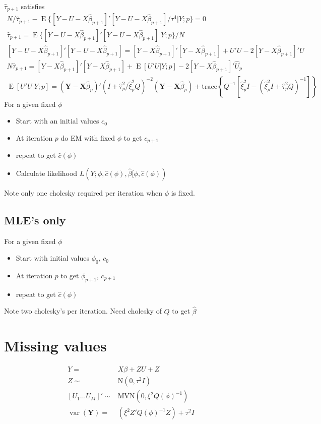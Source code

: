 \documentclass[12pt]{article}
\DeclareMathOperator{\E}{E}
\DeclareMathOperator{\var}{var}
\begin{document}
$\hat\tau_{p+1}$ satisfies
\begin{gather*}
N /\hat\tau_{p+1} -
\E\{[Y-U-X\hat\beta_{p+1}]'[Y-U-X\hat\beta_{p+1}]/\tau^4|Y;p\}=0\\
\hat\tau_{p+1} = \E\{[Y-U-X\hat\beta_{p+1}]'[Y-U-X\hat\beta_{p+1}]|Y;p\}/N\\
[Y-U-X\hat\beta_{p+1}]'[Y-U-X\hat\beta_{p+1}]=
[Y-X\hat\beta_{p+1}]'[Y-X\hat\beta_{p+1}]
+ U'U -2 [Y-X\hat\beta_{p+1}]' U \\
N \hat\tau_{p+1} = [Y-X\hat\beta_{p+1}]'[Y-X\hat\beta_{p+1}]+
\E[U'U|Y;p] - 2 [Y-X\hat\beta_{p+1}]' \hat U_p\\
\E[U'U|Y;p] = (\mathbf{Y} -
\mathbf{X}\hat\beta_p)' ( I + \hat\tau^2_p/\hat\xi^2_p Q  )^{-2}  (\mathbf{Y} -
\mathbf{X}\hat\beta_p) + \text{trace}\left\{ Q^{-1}\left[\hat\xi_p^2 I-
(\hat\xi_p^2  I + \hat\tau_p^2Q )^{-1} \right]\right\}
\end{gather*}
For a given fixed $\phi$
\begin{itemize}
  \item Start with an initial values  $c_0$
  \item At iteration $p$  do EM with fixed $\phi$ to get $c_{p+1}$
  \item repeat to get $\hat c(\phi)$
  \item Calculate likelihood
  $L(Y;\phi,\hat c(\phi), \hat\beta[\phi,\hat c(\phi)) $
\end{itemize}
Note only one cholesky required per iteration when $\phi$ is fixed.

\subsection*{MLE's only}
For a given fixed $\phi$
\begin{itemize}
  \item Start with initial values  $\phi_0$, $c_0$
  \item At iteration $p$  to get $\phi_{p+1}$, $c_{p+1}$
  \item repeat to get $\hat c(\phi)$
\end{itemize}
Note two cholesky's per iteration. Need cholesky of $Q$ to get $\hat\beta$

\section*{Missing values}

\begin{align*}
Y = & X \beta + Z U + Z\\
Z \sim & \text{N}(0, \tau^2I )\\
[U_1 \ldots U_M]' \sim  & \text{MVN}(0, \xi^2 Q(\phi)^{-1})\\
\var(\mathbf{Y})  = &  ( \xi^2 Z' Q(\phi)^{-1}Z)  + \tau^2 I    \\
\end{align*}
\end{document}
